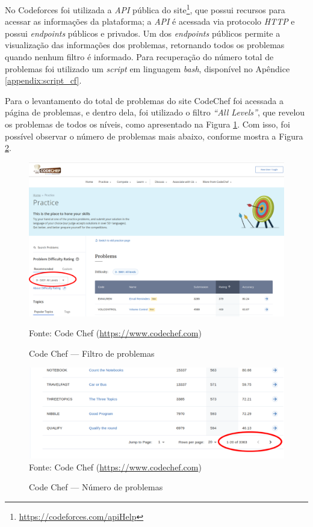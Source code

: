 No Codeforces foi utilizada a \textit{API} pública do site\footnote{\url{https://codeforces.com/apiHelp}}, que possui recursos para acessar as informações da plataforma; a \textit{API} é acessada via protocolo \textit{HTTP} e possui \textit{endpoints} públicos e privados. Um dos \textit{endpoints} públicos permite a visualização das informações dos problemas, retornando todos os problemas quando nenhum filtro é informado. Para recuperação do número total de problemas foi utilizado um \textit{script} em linguagem \textit{bash}, disponível no Apêndice \ref{appendix:script_cf}.

Para o levantamento do total de problemas do site CodeChef foi acessada a página de problemas, e dentro dela, foi utilizado o filtro \textit{``All Levels''}, que revelou os problemas de todos os níveis, como apresentado na Figura \ref{fig:code_chef_1}. Com isso, foi possível observar o número de problemas mais abaixo, conforme mostra a Figura \ref{fig:code_chef_2}.

\begin{figure}
    \centering
    \caption{Code Chef — Filtro de problemas}
    \includegraphics[keepaspectratio=true,scale=0.3]{figuras/code_chef_1.eps}
    \label{fig:code_chef_1}
    
    \medskip
    Fonte: Code Chef  (\url{https://www.codechef.com})
    \medskip
\end{figure}

\begin{figure}
    \centering
    \caption{Code Chef — Número de problemas}
    \includegraphics[keepaspectratio=true,scale=0.3]{figuras/code_chef_2.eps}
    \label{fig:code_chef_2}
    \medskip
    Fonte: Code Chef  (\url{https://www.codechef.com})
    \medskip
\end{figure}

